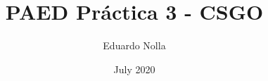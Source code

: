 
\usepackage[utf8]{inputenc}
\usepackage{geometry}
\setlength{\headheight}{13.6pt}
\geometry{left=33.02mm, right=33.02mm, bottom=25mm}
\usepackage{tabularx}
\usepackage{imakeidx}
\usepackage{color}   %
\usepackage[dvipsnames]{xcolor}
\usepackage{imakeidx}
\usepackage{svg}
\usepackage{amsmath}
\raggedbottom 
\usepackage[
  pdftex,
  pdfauthor={Eduardo Nolla},
  pdftitle={BBDD LSMotor},
  pdfsubject={BBDD},
  pdfproducer={LaTeX},
  pdfcreator={pdfLaTeX},
  pdfduplex={DuplexFlipLongEdge}, %
  pdflang={es}, %
]{hyperref}
\hypersetup{urlcolor=blue}
\usepackage[spanish]{babel}

\hypersetup{
    colorlinks=true, %
    linktoc=all,     %
    linkcolor=Blue,  %
}
\usepackage{fancyhdr}
\usepackage[utf8]{inputenc} %
\usepackage[T1]{fontenc} %
\usepackage{graphicx}
\graphicspath{ {D:\OneDrive\Estudios\uni\Curso_2\paed\practicas\proyecto2\latex\imagenes} }
\pagestyle{fancy}
\fancyhf{}
\fancyfoot[ER,LO]{\leftmark}
\fancyfoot[EL,RO]{\thepage}
 
\renewcommand{\headrulewidth}{1pt}
\renewcommand{\footrulewidth}{1pt}




\title{PAED Práctica 3 - CSGO}
\author{Eduardo Nolla}
\date{July 2020}
\usepackage{bookmark}
\usepackage[autostyle=true]{csquotes}
